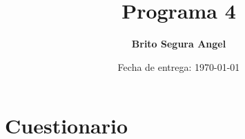 \documentclass[letterpaper,10.5pt]{article} %
\title{Programa 4}
\author{\textbf{Brito Segura Angel}}
\date{Fecha de entrega: \today}
\begin{document}
    \pagestyle{fancy} %
    \maketitle %
    
    
    \section{Cuestionario}
	
\end{document}
